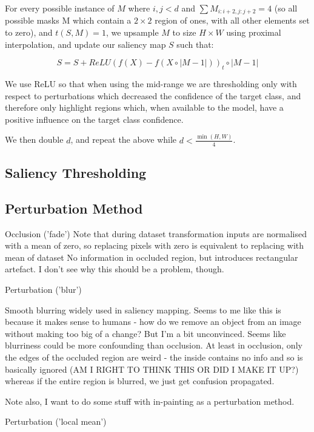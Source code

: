 \documentclass{article} %
\begin{document}
For every possible instance of $M$ where $i,j < d$ and $\sum{M_{i:i+2,j:j+2}} = 4$ (so all possible masks M which contain a $2 \times 2$ region of ones, with all other elements set to zero), and $t(S,M) = 1$, we upsample $M$ to size $H \times W$ using proximal interpolation, and update our saliency map $S$ such that: 

\begin{equation}
    S = S + ReLU(f(X)-f(X \circ |M-1|))_{t} \circ |M-1|
\end{equation}

We use ReLU so that when using the mid-range we are thresholding only with respect to perturbations which decreased the confidence of the target class, and therefore only highlight regions which, when available to the model, have a positive influence on the target class confidence. 

We then double $d$, and repeat the above while $d < \frac{\min{(H,W)}}{4}$.

\subsection{Saliency Thresholding}

\subsection{Perturbation Method}

Occlusion ('fade')
Note that during dataset transformation inputs are normalised with a mean of zero, so replacing pixels with zero is equivalent to replacing with mean of dataset
No information in occluded region, but introduces rectangular artefact. I don't see why this should be a problem, though. 

Perturbation ('blur')

Smooth blurring widely used in saliency mapping. Seems to me like this is because it makes sense to humans - how do we remove an object from an image without making too big of a change? But I'm a bit unconvinced. Seems like blurriness could be more confounding than occlusion. At least in occlusion, only the edges of the occluded region are weird - the inside contains no info and so is basically ignored (AM I RIGHT TO THINK THIS OR DID I MAKE IT UP?) whereas if the entire region is blurred, we just get confusion propagated. 

Note also, I want to do some stuff with in-painting as a perturbation method. 

Perturbation ('local mean')
\end{document}
